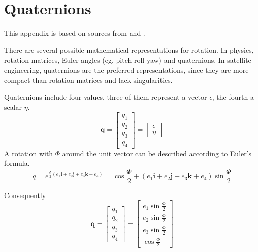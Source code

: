 \chapter{Quaternions } \label{chap:B}
This appendix is based on sources from \cite{SADC} and \cite{Kui}.

There are several possible mathematical representations for rotation. In physics, rotation matrices, Euler angles (eg. pitch-roll-yaw) and quaternions. In satellite engineering, quaternions are the preferred representations, since they are more compact than rotation matrices and lack singularities.

Quaternions include four values, three of them represent a vector \textbf{$\epsilon$}, the fourth a scalar $\eta$. 
\begin{equation}
\textbf{q} =
\left[ 
\begin{array}{cccc}
q_1 \\
q_2 \\  
q_3 \\
q_4 
\end{array}
\right] 
= 
\left[ 
\begin{array}{cccc}
\textbf{$\epsilon$} \\
\eta
\end{array}
\right] 
\end{equation}
A rotation with $\Phi$ around the unit vector can be described according to Euler's formula.
\begin{equation}
q = e^{\frac{\Phi}{2} (e_1 \textbf{i}+ e_2 \textbf{j} + e_3 \textbf{k} + e_4)} = \cos \frac{\Phi}{2} + (e_1 \textbf{i}+ e_2 \textbf{j} + e_3 \textbf{k} +e_4) \sin \frac{\Phi}{2}
\end{equation}

Consequently 
\begin{equation}
\textbf{q} =
\left[ 
\begin{array}{cccc}
q_1 \\
q_2 \\  
q_3 \\
q_4 
\end{array}
\right] 
= 
\left[ 
\begin{array}{cccc}
e_1  \sin \frac{\Phi}{2} \\
e_2  \sin \frac{\Phi}{2} \\  
e_3  \sin \frac{\Phi}{2} \\
\cos \frac{\Phi}{2} 
\end{array}
\right] 
\end{equation}

